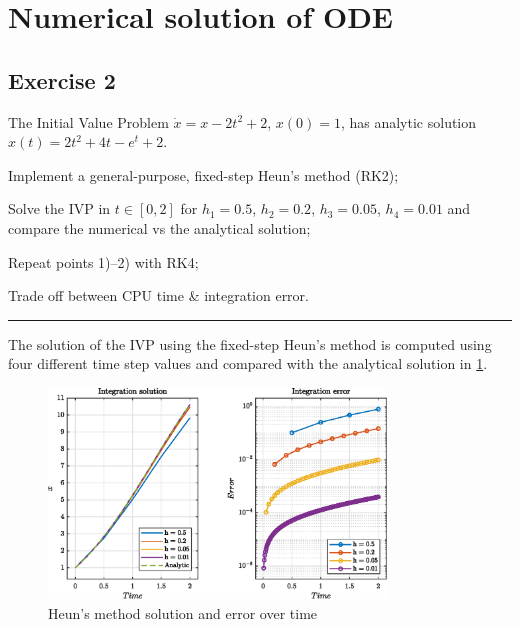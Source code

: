 \documentclass[11pt,a4paper,oneside]{article}
\begin{document}
\clearpage


\section{Numerical solution of ODE}
\subsection*{Exercise 2}

The Initial Value Problem $\dot x = x- 2t^2+2$, $x(0) = 1$, has analytic solution $x(t) = 2t^2 + 4t - e^t + 2$. 
\begin{enumerate*}[label=\arabic*)]
    \item Implement a general-purpose, fixed-step Heun's method (RK2);
    \item Solve the IVP in $t\in[0,2]$ for $h_1 = 0.5$, $h_2 = 0.2$, $h_3 = 0.05$, $h_4 = 0.01$ and compare the numerical vs the analytical solution;
    \item Repeat points 1)--2) with RK4;
    \item Trade off between CPU time \& integration error.
\end{enumerate*}

\medskip \hrule \medskip

The solution of the IVP using the fixed-step Heun's method is computed using four different time step values and compared with the analytical solution in \cref{fig:ex2_heun}.

\begin{figure}[htb]
    \centering
    \includegraphics*[width=0.8\textwidth, keepaspectratio]{ex2_heun.eps}
    \caption[]{\label{fig:ex2_heun} Heun's method solution and error over time}
\end{figure}
\end{document}
